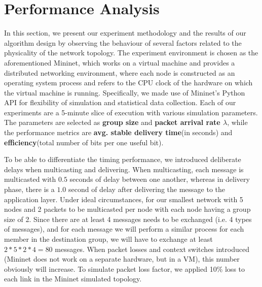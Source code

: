 \documentclass[a4paper, 12pt]{article}
\begin{document}
\section{Performance Analysis}
In this section, we present our experiment methodology and the results of our algorithm design by observing the behaviour of several factors related to the physicality of the network topology. The experiment environment is chosen as the aforementioned Mininet, which works on a virtual machine and provides a distributed networking environment, where each node is constructed as an operating system process and refers to the CPU clock of the hardware on which the virtual machine is running. Specifically, we made use of Mininet's Python API for flexibility of simulation and statistical data collection. Each of our experiments are a 5-minute slice of execution with various simulation parameters. The parameters are selected as \textbf{group size} and \textbf{packet arrival rate $\lambda $}, while the performance metrics are \textbf{avg. stable delivery time}(in seconds) and \textbf{efficiency}(total number of bits per one useful bit).

To be able to differentiate the timing performance, we introduced deliberate delays when multicasting and delivering. When multicasting, each message is multicasted with $0.5$ seconds of delay between one another, whereas in delivery phase, there is a $1.0$ second of delay after delivering the message to the application layer. Under ideal circumstances, for our smallest network with 5 nodes and 2 packets to be multicasted per node with each node having a group size of 2. Since there are at least 4 messages needs to be exchanged (i.e. 4 types of messages), and for each message we will perform a similar process for each member in the destination group, we will have to exchange at least $2*5*2*4=80$ messages. When packet losses and context switches introduced (Mininet does not work on a separate hardware, but in a VM), this number obviously will increase. To simulate packet loss factor, we applied 10\% loss to each link in the Mininet simulated topology.
\end{document}
